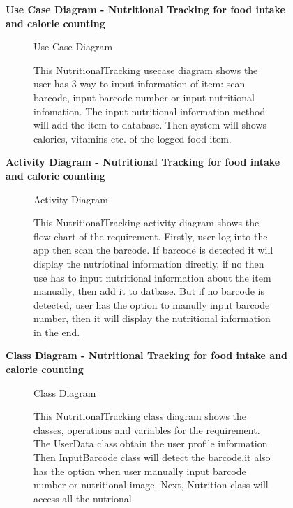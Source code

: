 \documentclass{article}
\begin{document}
	\begin{figure}[htbp]
		\textbf{Use Case Diagram - Nutritional Tracking for food intake and calorie counting }
		\centering
		\begin{subfigure}{\textwidth}
			\resizebox{\textwidth}{!}{}
			\caption{Use Case Diagram}
		\end{subfigure}
		\begin{subfigure}{\textwidth}
			This NutritionalTracking usecase diagram shows the user has 3 way to input information of item: scan barcode,
			input barcode number or input nutritional infomation. The input nutritional information method will add the item to database.
			Then system will shows calories, vitamins etc. of the logged food item.
		\end{subfigure}
		
	\end{figure}

	\clearpage
	

		\begin{figure}[htbp]
			\textbf{Activity Diagram - Nutritional Tracking for food intake and calorie counting}
			\centering
			\begin{subfigure}{\textwidth}
				\resizebox{\textwidth}{!}{}
				\caption{Activity Diagram}
			\end{subfigure}
			\begin{subfigure}{\textwidth}
				This NutritionalTracking activity diagram shows the flow chart of the requirement. Firstly, user log into the app then scan the barcode.
				If barcode is detected it will display the nutriotinal information directly, if no then use has to input nutritional information about the item
				manually, then add it to datbase. But if no barcode is detected, user has the option to manully input barcode number, then it will display the 
				nutritional information in the end.
			\end{subfigure}
		\end{figure}
		
		\clearpage

		\begin{figure}[htbp]
			\textbf{Class Diagram - Nutritional Tracking for food intake and calorie counting }
			\centering
			\begin{subfigure}{\textwidth}
				\resizebox{\textwidth}{!}{}
				\caption{Class Diagram}
			\end{subfigure}
			\begin{subfigure}{\textwidth}
				This NutritionalTracking class diagram shows the classes, operations and variables for the requirement.
				The UserData class obtain the user profile information. Then InputBarcode class will detect the barcode,it also has 
				the option when user manually input barcode number or nutritional image. Next, Nutrition class will access all the nutrional
			\end{subfigure}
		\end{figure}
		
\end{document}
